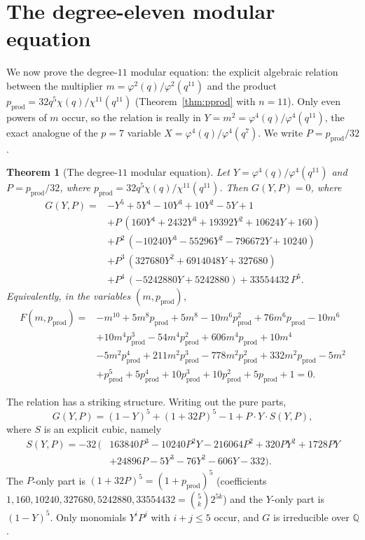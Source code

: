 \documentclass[11pt]{amsart}
\theoremstyle{plain}
\newtheorem{theorem}{Theorem}[section]
\theoremstyle{definition}
\theoremstyle{remark}
\newcommand{\Q}{\mathbb{Q}}
\newcommand{\pprod}{p_{\mathrm{prod}}}
\begin{document}
\section{The degree-eleven modular equation}
\label{sec:p11eq}

We now prove the degree-$11$ modular equation: the explicit algebraic relation
between the multiplier $m = \varphi^2(q)/\varphi^2(q^{11})$ and the product
$\pprod = 32q^5\chi(q)/\chi^{11}(q^{11})$ (Theorem~\ref{thm:pprod} with $n=11$).
Only even powers of $m$ occur, so the relation is really in
$Y = m^2 = \varphi^4(q)/\varphi^4(q^{11})$, the exact analogue of the $p=7$
variable $X = \varphi^4(q)/\varphi^4(q^7)$. We write $P = \pprod/32$.

\begin{theorem}[The degree-$11$ modular equation]
\label{thm:p11}
Let $Y = \varphi^4(q)/\varphi^4(q^{11})$ and $P = \pprod/32$, where
$\pprod = 32q^5\chi(q)/\chi^{11}(q^{11})$. Then $G(Y,P) = 0$, where
\begin{align}
G(Y,P) ={}& -Y^5 + 5Y^4 - 10Y^3 + 10Y^2 - 5Y + 1 \nonumber \\
&+ P\,(160Y^4 + 2432Y^3 + 19392Y^2 + 10624Y + 160) \nonumber \\
&+ P^2\,(-10240Y^3 - 55296Y^2 - 796672Y + 10240) \nonumber \\
&+ P^3\,(327680Y^2 + 6914048Y + 327680) \nonumber \\
&+ P^4\,(-5242880Y + 5242880) + 33554432\,P^5.
\label{eq:G}
\end{align}
Equivalently, in the variables $(m,\pprod)$,
\begin{align}
F(m,\pprod) ={}& -m^{10} + 5m^8\pprod + 5m^8 - 10m^6\pprod^2 + 76m^6\pprod - 10m^6 \nonumber \\
&+ 10m^4\pprod^3 - 54m^4\pprod^2 + 606m^4\pprod + 10m^4 \nonumber \\
&- 5m^2\pprod^4 + 211m^2\pprod^3 - 778m^2\pprod^2 + 332m^2\pprod - 5m^2 \nonumber \\
&+ \pprod^5 + 5\pprod^4 + 10\pprod^3 + 10\pprod^2 + 5\pprod + 1 = 0.
\label{eq:F}
\end{align}
\end{theorem}

The relation has a striking structure. Writing out the pure parts,
\begin{equation}
G(Y,P) = (1-Y)^5 + (1+32P)^5 - 1 + P\cdot Y\cdot S(Y,P),
\label{eq:Gstruct}
\end{equation}
where $S$ is an explicit cubic, namely
\begin{align}
S(Y,P) = -32\,\big(&163840P^3 - 10240P^2Y - 216064P^2 + 320PY^2 + 1728PY \nonumber \\
&+ 24896P - 5Y^3 - 76Y^2 - 606Y - 332\big).
\end{align}
The $P$-only part is $(1+32P)^5 = (1+\pprod)^5$ (coefficients $1, 160, 10240,
327680, 5242880, 33554432 = \binom{5}{k}2^{5k}$) and the $Y$-only part is
$(1-Y)^5$. Only monomials $Y^iP^j$ with $i+j \leq 5$ occur, and $G$ is irreducible
over $\Q$.
\end{document}
